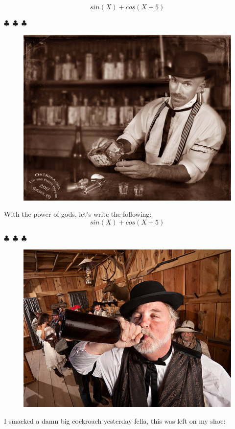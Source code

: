 \documentclass{article}
\begin{document}
\begin{equation}
{{sin({X})}+{cos({{X}+{5}})}}
\end{equation}
\begin{center} $\clubsuit$~$\clubsuit$~$\clubsuit$ \end{center}\begin{figure}[H] \includegraphics[scale=0.3]{funny_pics/bartender.jpg} \end{figure} With the power of gods, let's write the following: 
\begin{equation}
{{sin({X})}+{cos({{X}+{5}})}}
\end{equation}
\begin{center} $\clubsuit$~$\clubsuit$~$\clubsuit$ \end{center}\begin{figure}[H] \includegraphics[scale=1.4]{funny_pics/drunk_cowboy.jpg} \end{figure} I smacked a damn big cockroach yesterday fella, this was left on my shoe: 
\end{document}
